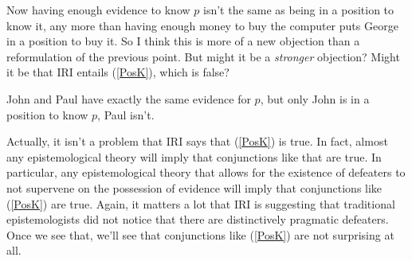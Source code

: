 \documentclass[oneside]{book}
\renewcommand{\numbex}[2]{
\begin{enumerate*}
\setcounter{enumi}{\value{paper}}
\renewcommand{\labelenumi}{(\arabic{enumi})}
#2
\end{enumerate*}
\addtocounter{paper}{#1}}
\begin{document}
\noindent Now having enough evidence to know $p$ isn't the same as being in a position to know it, any more than having enough money to buy the computer puts George in a position to buy it. So I think this is more of a new objection than a reformulation of the previous point. But might it be a \textit{stronger} objection? Might it be that IRI entails (\ref{PosK}), which is false?

\numbex{1}{
\item \label{PosK} John and Paul have exactly the same evidence for $p$, but only John is in a position to know $p$, Paul isn't.}

\noindent Actually, it isn't a problem that IRI says that (\ref{PosK}) is true. In fact, almost any epistemological theory will imply that conjunctions like that are true. In particular, any epistemological theory that allows for the existence of defeaters to not supervene on the possession of evidence will imply that conjunctions like (\ref{PosK}) are true. Again, it matters a lot that IRI is suggesting that traditional epistemologists did not notice that there are distinctively pragmatic defeaters. Once we see that, we'll see that conjunctions like (\ref{PosK}) are not surprising at all.

\end{document}
